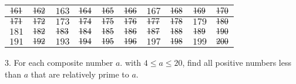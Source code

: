 \begin{mdframed}[style=darkAnswer,frametitle={Joe Starr}]
\begin{center}
\begin{tabular}{| c | c | c | c | c | c | c | c | c | c |}
      \hline
      $\msout{161}$ & $\msout{162}$ & $163$         & $\msout{164}$ & $\msout{165}$ &
      $\msout{166}$ & $167$         & $\msout{168}$ & $\msout{169}$ & $\msout{170}$                                       \\
      \hline
      $\msout{171}$ & $\msout{172}$ & $173$         & $\msout{174}$ & $\msout{175}$ &
      $\msout{176}$ & $\msout{177}$ & $\msout{178}$ & $179$         & $\msout{180}$                                       \\
      \hline
      $181$         & $\msout{182}$ & $\msout{183}$ & $\msout{184}$ & $\msout{185}$ &
      $\msout{186}$ & $\msout{187}$ & $\msout{188}$ & $\msout{189}$ &
      $\msout{190}$                                                                                                       \\
      \hline
      $191$         & $\msout{192}$ & $193$         & $\msout{194}$ & $\msout{195}$ &
      $\msout{196}$ & $197$         & $\msout{198}$ & $199$         & $\msout{200}$                                       \\
      \hline
    \end{tabular}
  \end{center}
\end{mdframed}
\newpage
\begin{mdframed}[style=darkQuesion]
  3. For each composite number $a$. with $4\leq a\leq 20$, find all positive
  numbers less than $a$ that are relatively prime to $a$.
\end{mdframed}

